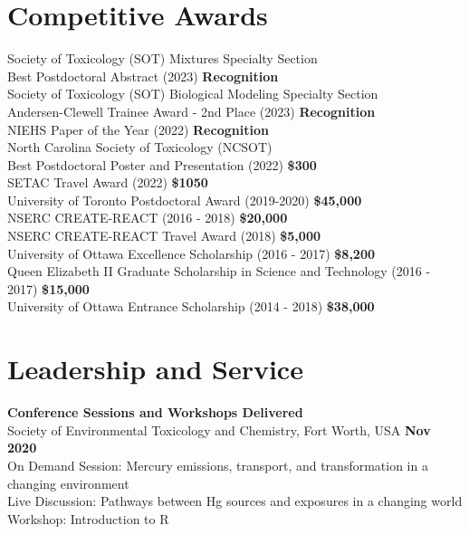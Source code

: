 \documentclass[margin,line]{res}
\begin{document}
\begin{resume}
\section{\sc Competitive Awards}

Society of Toxicology (SOT) Mixtures Specialty Section\\
Best Postdoctoral Abstract (2023)
\hfill {\textbf{Recognition}}\\
Society of Toxicology (SOT) Biological Modeling Specialty Section\\
Andersen-Clewell Trainee Award - 2nd Place (2023)
\hfill {\textbf{Recognition}}\\
NIEHS Paper of the Year (2022)
\hfill {\textbf{Recognition}}\\
North Carolina Society of Toxicology (NCSOT)\\
Best Postdoctoral Poster and Presentation (2022)
\hfill {\textbf{\$300}}\\
SETAC Travel Award (2022)
\hfill {\textbf{\$1050}}\\
University of Toronto Postdoctoral Award (2019-2020)
\hfill {\textbf{\$45,000}}\\
NSERC CREATE-REACT (2016 - 2018)
\hfill {\textbf{\$20,000}}\\
NSERC CREATE-REACT Travel Award (2018)
\hfill {\textbf{\$5,000}}\\
University of Ottawa Excellence Scholarship (2016 - 2017)
\hfill {\textbf{\$8,200}}\\
Queen Elizabeth II Graduate Scholarship in Science and Technology (2016 - 2017)
\hfill {\textbf{\$15,000}}\\
University of Ottawa Entrance Scholarship (2014 - 2018)
\hfill {\textbf{\$38,000}}\\

\vspace*{.1in}

\section{\sc Leadership and Service}
{\bf Conference Sessions and Workshops Delivered}\\
Society of Environmental Toxicology and Chemistry, Fort Worth, USA \hfill {\bf  Nov 2020}\\
On Demand Session: Mercury emissions, transport, and transformation in a changing environment\\
Live Discussion: Pathways between Hg sources and exposures in a changing world\\
Workshop: Introduction to R


\end{resume}
\end{document}
